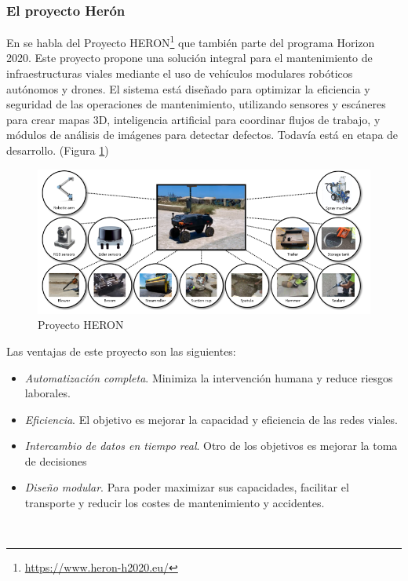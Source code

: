 \subsubsection{El proyecto Herón}

En \cite{10.1145/3529190.3534746} se habla del Proyecto HERON\footnote{\url{https://www.heron-h2020.eu/}} que también parte del programa Horizon 2020. Este proyecto propone una solución integral para el mantenimiento de infraestructuras viales mediante el uso de vehículos modulares robóticos autónomos y drones. El sistema está diseñado para optimizar la eficiencia y seguridad de las operaciones de mantenimiento, utilizando sensores y escáneres para crear mapas 3D, inteligencia artificial para coordinar flujos de trabajo, y módulos de análisis de imágenes para detectar defectos. Todavía está en etapa de desarrollo. (Figura \ref{fig:heron})


\begin{figure} [h!]
	\begin{center}
		\includegraphics[width=16cm]{figs/heron.png}
	\end{center}
	\caption{Proyecto HERON}
	\label{fig:heron}
\end{figure}

Las ventajas de este proyecto son las siguientes:

\begin{itemize}
	\item \textit{Automatización completa}. Minimiza la intervención humana y reduce riesgos laborales.
	\item \textit{Eficiencia}. El objetivo es mejorar la capacidad y eficiencia de las redes viales.
	\item \textit{Intercambio de datos en tiempo real}. Otro de los objetivos es mejorar la toma de decisiones
	\item \textit{Diseño modular}. Para poder maximizar sus capacidades, facilitar el transporte y reducir los costes de mantenimiento y accidentes.
\end{itemize}\

